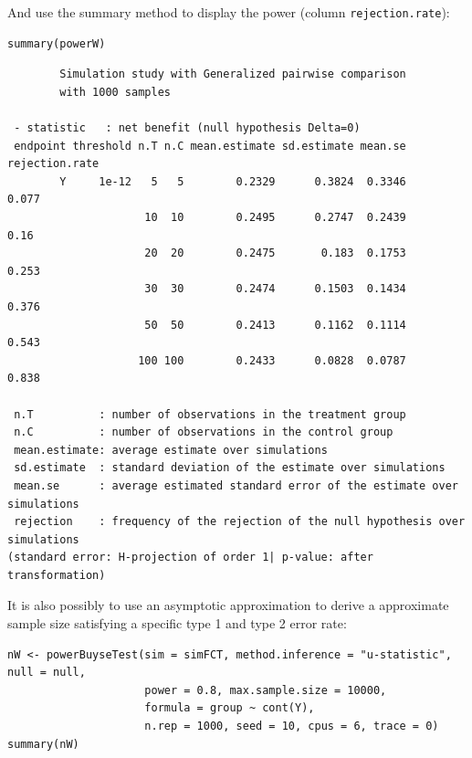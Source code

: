 \documentclass[12pt]{article}
\begin{document}
\clearpage

And use the summary method to display the power (column
\texttt{rejection.rate}):
\lstset{language=r,label= ,caption= ,captionpos=b,numbers=none}
\begin{lstlisting}
summary(powerW)
\end{lstlisting}

\begin{verbatim}
        Simulation study with Generalized pairwise comparison
        with 1000 samples

 - statistic   : net benefit (null hypothesis Delta=0)
 endpoint threshold n.T n.C mean.estimate sd.estimate mean.se rejection.rate
        Y     1e-12   5   5        0.2329      0.3824  0.3346          0.077
                     10  10        0.2495      0.2747  0.2439           0.16
                     20  20        0.2475       0.183  0.1753          0.253
                     30  30        0.2474      0.1503  0.1434          0.376
                     50  50        0.2413      0.1162  0.1114          0.543
                    100 100        0.2433      0.0828  0.0787          0.838

 n.T          : number of observations in the treatment group
 n.C          : number of observations in the control group
 mean.estimate: average estimate over simulations
 sd.estimate  : standard deviation of the estimate over simulations
 mean.se      : average estimated standard error of the estimate over simulations
 rejection    : frequency of the rejection of the null hypothesis over simulations
(standard error: H-projection of order 1| p-value: after transformation)
\end{verbatim}

It is also possibly to use an asymptotic approximation to derive a
approximate sample size satisfying a specific type 1 and type 2 error
rate:
\lstset{language=r,label= ,caption= ,captionpos=b,numbers=none}
\begin{lstlisting}
nW <- powerBuyseTest(sim = simFCT, method.inference = "u-statistic", null = null,
                     power = 0.8, max.sample.size = 10000,                     
                     formula = group ~ cont(Y), 
                     n.rep = 1000, seed = 10, cpus = 6, trace = 0)
summary(nW)
\end{lstlisting}
\end{document}
